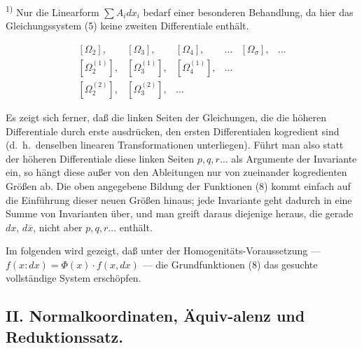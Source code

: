 \documentclass[12pt,a4paper]{article}
\begin{document}
\noindent\textsuperscript{1)} Nur die Linearform $\sum A_{i}dx_{i}$ bedarf einer besonderen Behandlung, da hier das Gleichungssystem (5) keine zweiten Differentiale enth\"alt.

\begin{equation}\tag{8}
\begin{matrix}
[\varOmega_{2}], & [\varOmega_{3}], & [\varOmega_{4}], & \ldots & [\varOmega_{\sigma}], & \ldots\\
[\varOmega_{2}^{(1)}], & [\varOmega_{3}^{(1)}], & [\varOmega_{4}^{(1)}], & \ldots\\
[\varOmega_{2}^{(2)}], & [\varOmega_{3}^{(2)}], & \ldots
\end{matrix}
\end{equation}

Es zeigt sich ferner, da\ss{} die linken Seiten der Gleichungen, die die h\"oheren Differentiale durch erste ausdr\"ucken, den ersten Differentialen kogredient sind (d.\ h.\ denselben linearen Transformationen unterliegen). F\"uhrt man also statt der h\"oheren Differentiale diese linken Seiten $p,q,r\ldots$ als Argumente der Invariante ein, so h\"angt diese au\ss{}er von den Ableitungen nur von zueinander kogredienten Gr\"o\ss{}en ab. Die oben angegebene Bildung der Funktionen (8) kommt einfach auf die Einf\"uhrung dieser neuen Gr\"o\ss{}en hinaus; jede Invariante geht dadurch in eine Summe von Invarianten \"uber, und man greift daraus diejenige heraus, die gerade $dx$, $d\bar{x}$, nicht aber $p,q,r\ldots$ enth\"alt.

Im folgenden wird gezeigt, da\ss{} unter der Homogenit\"ats-Voraussetzung --- $f(x:\!dx)=\Phi(x)\cdot f(x,dx)$ --- die Grundfunktionen (8) das gesuchte vollst\"andige System ersch\"opfen.

\subsection*{II. Normalkoordinaten, \"Aquiv-alenz und Reduktionssatz.}
\end{document}
